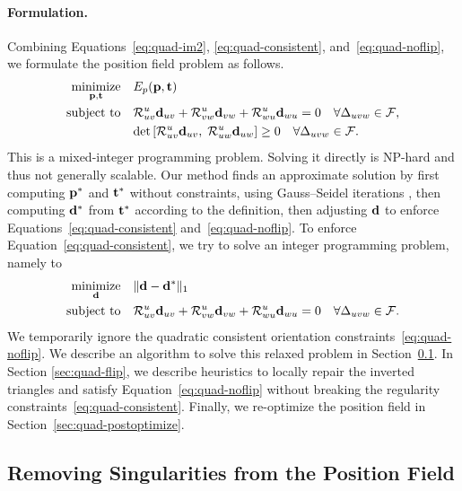 \paragraph*{Formulation.}
Combining Equations~\eqref{eq:quad-im2}, \eqref{eq:quad-consistent}, and~\eqref{eq:quad-noflip}, we formulate the position field problem as follows.
\begin{align*}
\operatorname*{minimize}_{\mathbf{p}, \mathbf{t}} \quad & E_p(\mathbf{p}, \mathbf{t})\\
\text{subject to} \quad & \mathcal{R}^u_{uv}{\mathbf{d}}_{uv} + \mathcal{R}^u_{vw}{\mathbf{d}}_{vw} + \mathcal{R}^u_{wu}{\mathbf{d}}_{wu} = 0 \quad \forall \Delta_{uvw} \in \mathcal{F},  \\
				   & \text{det} \left[\mathcal{R}^u_{uv}{\mathbf{d}}_{uv},\;\mathcal{R}^u_{uw}{\mathbf{d}}_{uw}\right]\geq 0 \quad \forall \Delta_{uvw} \in \mathcal{F}.
\end{align*}
This is a mixed-integer programming problem. Solving it directly is NP-hard and thus not generally scalable. Our method finds an approximate solution by first computing $\mathbf{p}^*$ and $\mathbf{t}^*$ without constraints, using Gauss--Seidel iterations \cite{jakob2015instant}, then computing $\mathbf{d}^*$ from $\mathbf{t}^*$ according to the definition, then adjusting $\mathbf{d}$ to enforce Equations~\eqref{eq:quad-consistent} and~\eqref{eq:quad-noflip}. To enforce Equation~\eqref{eq:quad-consistent}, we try to solve an integer programming problem, namely to
\begin{align}
\operatorname*{minimize}_{\mathbf{d}} \quad & \lVert \mathbf{d}-\mathbf{d}^*\rVert_1 \label{eq:quad-formulation} \\
\text{subject to} \quad &
\mathcal{R}^u_{uv}{\mathbf{d}}_{uv} + \mathcal{R}^u_{vw}{\mathbf{d}}_{vw} + \mathcal{R}^u_{wu}{\mathbf{d}}_{wu} = 0 \quad \forall \Delta_{uvw} \in \mathcal{F}.\nonumber
\end{align}
We temporarily ignore the quadratic consistent orientation constraints~\eqref{eq:quad-noflip}. We describe an algorithm to solve this relaxed problem in Section~\ref{sec:quad-maxflow}.   In Section \ref{sec:quad-flip}, we describe heuristics to locally repair the inverted triangles and satisfy Equation~\eqref{eq:quad-noflip} without breaking the regularity constraints~\eqref{eq:quad-consistent}.  Finally, we re-optimize the position field in Section~\ref{sec:quad-postoptimize}.

\subsection{Removing Singularities from the Position Field}
\label{sec:quad-maxflow}

